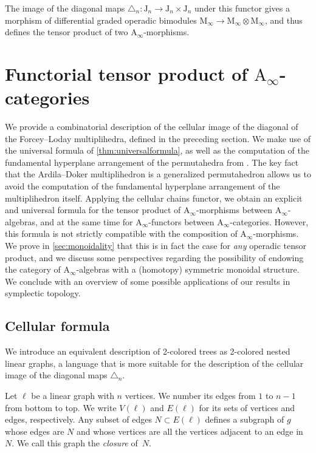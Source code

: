 \documentclass[twoside, 12pt]{amsart}
\theoremstyle{remark}
\newcommand{\J}{\mathrm{J}}
\newcommand{\gra}{\ell}
\newcommand{\Ainf}{\mathrm{A}_\infty} %
\newcommand{\Minf}{\mathrm{M}_\infty} %
\begin{document}
The image of the diagonal maps $\triangle_n : \J_n \to \J_n \times \J_n$ under this functor gives a morphism of differential graded operadic bimodules $\Minf \to \Minf \otimes \Minf$, and thus defines the tensor product of two $\mathrm{A}_\infty$-morphisms. 


\section{Functorial tensor product of $\mathrm{A}_\infty$-categories}
\label{sec:III}

We provide a combinatorial description of the cellular image of the diagonal of the Forcey--Loday multiplihedra, defined in the preceding section. 
We make use of the universal formula of \cref{thm:universalformula}, as well as the computation of the fundamental hyperplane arrangement of the permutahedra from \cite{LA21}.
The key fact that the Ardila--Doker multiplihedron is a generalized permutahedron allows us to avoid the computation of the fundamental hyperplane arrangement of the multiplihedron itself. 
Applying the cellular chains functor, we obtain an explicit and universal formula for the tensor product of $\mathrm{A}_\infty$-morphisms between $\mathrm{A}_\infty$-algebras, and at the same time for $\mathrm{A}_\infty$-functors between $\mathrm{A}_\infty$-categories. 
However, this formula is not strictly compatible with the composition of $\Ainf$-morphisms. 
We prove in \cref{sec:monoidality} that this is in fact the case for \emph{any} operadic tensor product, and we discuss some perspectives regarding the possibility of endowing the category of $\Ainf$-algebras with a (homotopy) symmetric monoidal structure.
We conclude with an overview of some possible applications of our results in symplectic topology. 


\subsection{Cellular formula}

We introduce an equivalent description of 2-colored trees as 2-colored nested linear graphs, a language that is more suitable for the description of the cellular image of the diagonal maps $\triangle_n$. 

Let $\gra$ be a linear graph with $n$ vertices. 
We number its edges from $1$ to $n-1$ from bottom to top. 
We write $V(\gra)$ and $E(\gra)$ for its sets of vertices and edges, respectively.
Any subset of edges $N\subset E(\gra)$ defines a subgraph of $g$ whose edges are $N$ and whose vertices are all the vertices adjacent to an edge in $N$. 
We call this graph the \emph{closure} of~$N$. 
\end{document}
